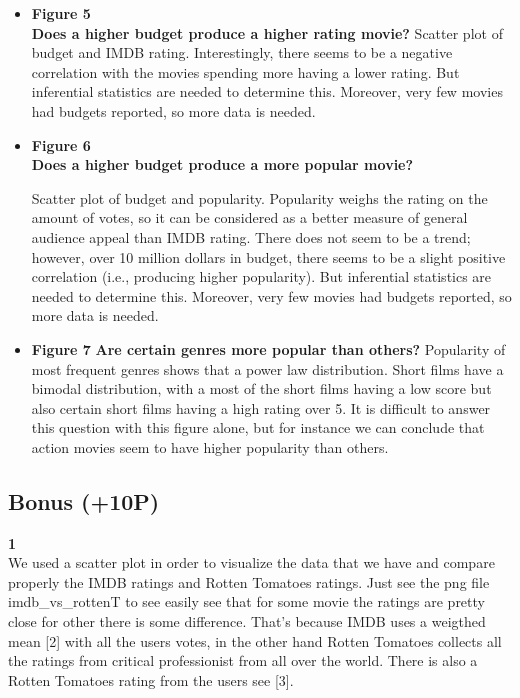 \documentclass[a4paper]{article}
\begin{document}
	\begin{itemize}
		\item \textbf{Figure 5}\\
		\textbf{Does a higher budget produce a higher rating movie?}
		Scatter plot of budget and IMDB rating. Interestingly, there seems to be a negative correlation with the movies spending more having a lower rating. But inferential statistics are needed to determine this. Moreover, very few movies had budgets reported, so more data is needed.    
		
		
		\item \textbf{Figure 6}\\
		 \textbf{Does a higher budget produce a more popular movie?}
		
		Scatter plot of budget and popularity. Popularity weighs the rating on the amount of votes, so it can be considered as a better measure of general audience appeal than IMDB rating. There does not seem to be a trend; however, over 10 million dollars in budget, there seems to be a slight positive correlation (i.e., producing higher popularity). But inferential statistics are needed to determine this. Moreover, very few movies had budgets reported, so more data is needed.    
		
		
		\item \textbf{Figure 7} 
		\textbf{Are certain genres more popular than others?}
		Popularity of most frequent genres shows that a power law distribution. Short films have a bimodal distribution, with a most of the short films having a low score but also certain short films having a high rating over 5. It is difficult to answer this question with this figure alone, but for instance we can conclude that action movies seem to have higher popularity than others.
		
	\end{itemize}
		
	\subsection{Bonus (+10P)}
	
	\textbf{1}\\
	We used a scatter plot in order to visualize the data that we have and compare properly the IMDB ratings and Rotten Tomatoes ratings.
	Just see the png file imdb\_vs\_rottenT to see easily see that for some movie the ratings are pretty close for other there is some difference.
	That's because IMDB uses a weigthed mean [2] with all the users votes, in the other hand Rotten Tomatoes collects all the ratings from critical professionist from all over the world. There is also a Rotten Tomatoes rating from the users see [3].
\end{document}
